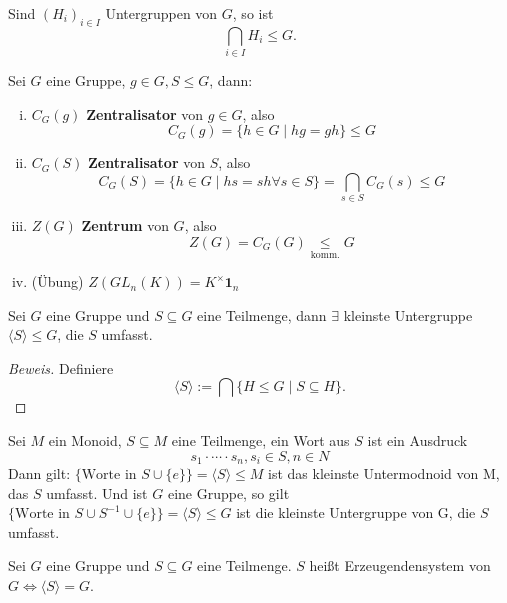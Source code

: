 \documentclass[a4paper]{report}
\begin{document}
\begin{prop}[Übung]
Sind $(H_{i})_{i \in I}$ Untergruppen von $G$, so ist
$$\bigcap_{i \in I} H_{i} \leq G.$$
\end{prop}

\begin{bsp*}
  Sei $G$ eine Gruppe, $g  \in G, S \le G$, dann:
  \begin{enumerate}[(i)] %
\item $C_{G}(g)$ \textbf{Zentralisator} von $g \in G$, also $$C_{G}(g) = \{h \in G \mid hg = gh\} \le G$$
\item $C_{G}(S)$ \textbf{Zentralisator} von $S$, also $$C_{G}(S) = \{h \in G \mid hs = sh \forall s \in S\} = \bigcap_{s \in S} C_{G}(s) \le G$$
\item $Z(G)$ \textbf{Zentrum} von $G$, also $$Z(G)=C_{G}(G) \underset{\text{komm.}}\le G$$
\item (Übung) $Z(GL_{n}(K)) = K^{\times}\mathbf{1}_{n}$
  \end{enumerate}

\end{bsp*}

\begin{lemm}
  Sei $G$ eine Gruppe und $S \subseteq G$ eine Teilmenge, dann $\exists$ kleinste Untergruppe $\langle S \rangle \le G$, die $S$ umfasst.
  \begin{proof}[Beweis]
    Definiere $$\langle S \rangle := \bigcap \{H \leq G \mid S \subseteq H\}.$$
  \end{proof}

\end{lemm}

\begin{ubng}
Sei $M$ ein Monoid, $S \subseteq M$ eine Teilmenge, ein Wort aus $S$ ist ein Ausdruck $$s_{1} \cdot \cdots \cdot s_{n}, s_{i} \in S, n\in N$$
Dann gilt: $\{\text{Worte in } S \cup \{e\}\} = \langle S \rangle \le M$ ist das kleinste Untermodnoid von M, das $S$ umfasst.
Und ist $G$ eine Gruppe, so gilt $\{\text{Worte in } S \cup S^{-1} \cup \{e\}\} = \langle S \rangle \le G$ ist die kleinste Untergruppe von G, die $S$ umfasst.
\end{ubng}

\begin{defi}
Sei $G$ eine Gruppe und $S \subseteq G$ eine Teilmenge. $S$ heißt Erzeugendensystem von $G \iff \langle S \rangle = G$.
\end{defi}
\end{document}
